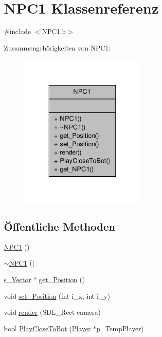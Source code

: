 \hypertarget{class_n_p_c1}{\section{N\-P\-C1 Klassenreferenz}
\label{class_n_p_c1}
}


{\ttfamily \#include $<$N\-P\-C1.\-h$>$}



Zusammengehörigkeiten von N\-P\-C1\-:
\nopagebreak
\begin{figure}[H]
\begin{center}
\leavevmode
\includegraphics[width=182pt]{class_n_p_c1__coll__graph}
\end{center}
\end{figure}
\subsection*{Öffentliche Methoden}
\begin{DoxyCompactItemize}
\item 
\hyperlink{class_n_p_c1_ad76416c9a95fb9a774976297c8593595}{N\-P\-C1} ()
\item 
\hyperlink{class_n_p_c1_ab204b325bcd16659c66a491c9b10e8e2}{$\sim$\-N\-P\-C1} ()
\item 
\hyperlink{structs___vector}{s\-\_\-\-Vector} $\ast$ \hyperlink{class_n_p_c1_aa76eead3904b61145d210ee5d077fab9}{get\-\_\-\-Position} ()
\item 
void \hyperlink{class_n_p_c1_a6f7d2842c3ad04969ed90722324875b4}{set\-\_\-\-Position} (int i\-\_\-x, int i\-\_\-y)
\item 
void \hyperlink{class_n_p_c1_a3fa4f42017cbef90df3fc010de47f452}{render} (S\-D\-L\-\_\-\-Rect camera)
\item 
bool \hyperlink{class_n_p_c1_a630634825b51471ec57664e03f8f69c1}{Play\-Close\-To\-Bot} (\hyperlink{class_player}{Player} $\ast$p\-\_\-\-Temp\-Player)
\end{DoxyCompactItemize}
